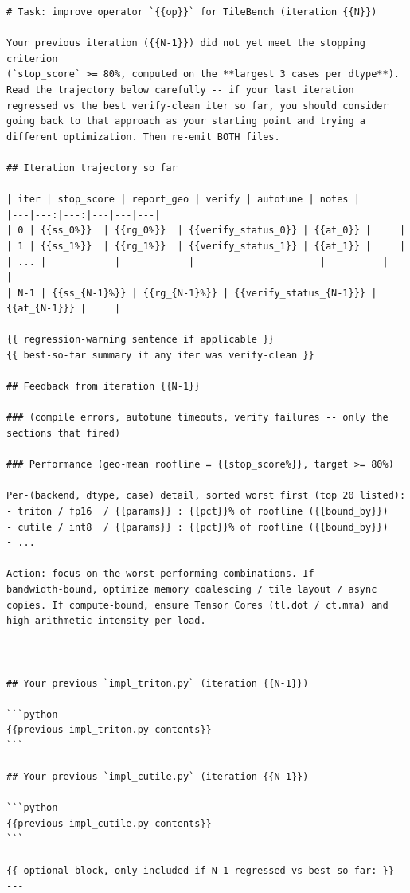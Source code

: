 \documentclass[11pt]{article}
\begin{document}
\begin{promptbox}
\begin{verbatim}
# Task: improve operator `{{op}}` for TileBench (iteration {{N}})

Your previous iteration ({{N-1}}) did not yet meet the stopping criterion
(`stop_score` >= 80%, computed on the **largest 3 cases per dtype**).
Read the trajectory below carefully -- if your last iteration
regressed vs the best verify-clean iter so far, you should consider
going back to that approach as your starting point and trying a
different optimization. Then re-emit BOTH files.

## Iteration trajectory so far

| iter | stop_score | report_geo | verify | autotune | notes |
|---|---:|---:|---|---|---|
| 0 | {{ss_0%}}  | {{rg_0%}}  | {{verify_status_0}} | {{at_0}} |     |
| 1 | {{ss_1%}}  | {{rg_1%}}  | {{verify_status_1}} | {{at_1}} |     |
| ... |            |            |                      |          |     |
| N-1 | {{ss_{N-1}%}} | {{rg_{N-1}%}} | {{verify_status_{N-1}}} | {{at_{N-1}}} |     |

{{ regression-warning sentence if applicable }}
{{ best-so-far summary if any iter was verify-clean }}

## Feedback from iteration {{N-1}}

### (compile errors, autotune timeouts, verify failures -- only the
sections that fired)

### Performance (geo-mean roofline = {{stop_score%}}, target >= 80%)

Per-(backend, dtype, case) detail, sorted worst first (top 20 listed):
- triton / fp16  / {{params}} : {{pct}}% of roofline ({{bound_by}})
- cutile / int8  / {{params}} : {{pct}}% of roofline ({{bound_by}})
- ...

Action: focus on the worst-performing combinations. If
bandwidth-bound, optimize memory coalescing / tile layout / async
copies. If compute-bound, ensure Tensor Cores (tl.dot / ct.mma) and
high arithmetic intensity per load.

---

## Your previous `impl_triton.py` (iteration {{N-1}})

```python
{{previous impl_triton.py contents}}
```

## Your previous `impl_cutile.py` (iteration {{N-1}})

```python
{{previous impl_cutile.py contents}}
```

{{ optional block, only included if N-1 regressed vs best-so-far: }}
---


\end{verbatim}
\end{promptbox}
\end{document}

